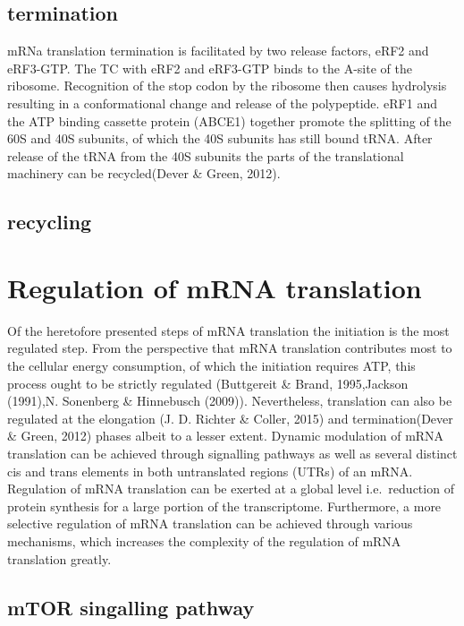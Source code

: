 \documentclass[12pt,openany]{book}
\begin{document}
\subsection{termination}

mRNa translation termination is facilitated by two release factors, eRF2
and eRF3-GTP. The TC with eRF2 and eRF3-GTP binds to the A-site of the
ribosome. Recognition of the stop codon by the ribosome then causes
hydrolysis resulting in a conformational change and release of the
polypeptide. eRF1 and the ATP binding cassette protein (ABCE1) together
promote the splitting of the 60S and 40S subunits, of which the 40S
subunits has still bound tRNA. After release of the tRNA from the 40S
subunits the parts of the translational machinery can be recycled(Dever
\& Green, 2012).

\subsection{recycling}

\section{Regulation of mRNA translation}

Of the heretofore presented steps of mRNA translation the initiation is
the most regulated step. From the perspective that mRNA translation
contributes most to the cellular energy consumption, of which the
initiation requires ATP, this process ought to be strictly regulated
(Buttgereit \& Brand, 1995,Jackson (1991),N. Sonenberg \& Hinnebusch
(2009)). Nevertheless, translation can also be regulated at the
elongation (J. D. Richter \& Coller, 2015) and termination(Dever \&
Green, 2012) phases albeit to a lesser extent. Dynamic modulation of
mRNA translation can be achieved through signalling pathways as well as
several distinct cis and trans elements in both untranslated regions
(UTRs) of an mRNA. Regulation of mRNA translation can be exerted at a
global level i.e.~reduction of protein synthesis for a large portion of
the transcriptome. Furthermore, a more selective regulation of mRNA
translation can be achieved through various mechanisms, which increases
the complexity of the regulation of mRNA translation greatly.

\subsection{mTOR singalling pathway} \label{mTOR}
\end{document}
